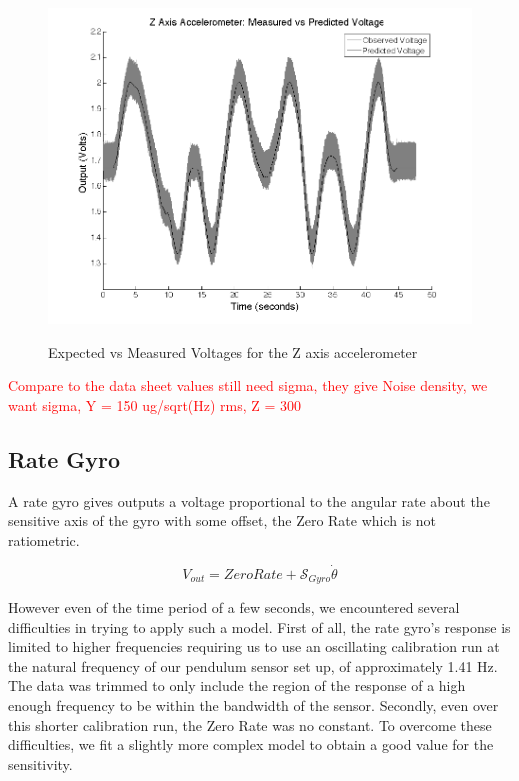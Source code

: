 \documentclass{article}
\newcommand{\xxx}[1]{\textcolor{red}{#1}}
\theoremstyle{plain}
\theoremstyle{definition}
\theoremstyle{remark}
\newcommand{\Sens}{\mathcal{S}}
\begin{document}
\begin{figure}
\begin{center}
\includegraphics[width = 13cm]{ZaxisAccel_Calib.png}
\label{ZaccelCalib}
\caption{Expected vs Measured Voltages for the Z axis accelerometer}
\end{center}
\end{figure}

\xxx{Compare to the data sheet values still need sigma, they give Noise density, we want sigma, Y = 150 ug/sqrt(Hz) rms, Z = 300}

\subsection*{Rate Gyro}


A rate gyro gives outputs a voltage proportional to the angular rate about the sensitive axis of the gyro with some offset, the Zero Rate which is not ratiometric.  

$$V_{out} = ZeroRate + \Sens_{Gyro} \dot{\theta} $$

However even of the time period of a few seconds, we encountered several difficulties in trying to apply such a model.  First of all, the rate gyro's response is limited to higher frequencies requiring us to use an oscillating calibration run at the natural frequency of our pendulum sensor set up, of approximately 1.41 Hz.  The data was trimmed to only include the region of the response of a high enough frequency to be within the bandwidth of the sensor.  Secondly, even over this shorter calibration run, the Zero Rate was no constant.  To overcome these difficulties, we fit a slightly more complex model to obtain a good value for the sensitivity.
\end{document}
